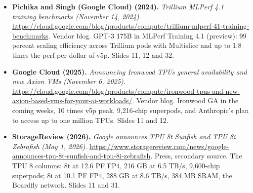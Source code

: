 \documentclass[11pt,letterpaper]{article}
\begin{document}
\begin{itemize}[leftmargin=1.2em,itemsep=3pt]
\item \textbf{Pichika and Singh (Google Cloud) (2024).} \textit{Trillium MLPerf 4.1 training benchmarks (November 14, 2024)}. \url{https://cloud.google.com/blog/products/compute/trillium-mlperf-41-training-benchmarks}. Vendor blog. GPT-3 175B in MLPerf Training 4.1 (preview): 99 percent scaling efficiency across Trillium pods with Multislice and up to 1.8 times the perf per dollar of v5p. Slides 11, 12 and 32.
\item \textbf{Google Cloud (2025).} \textit{Announcing Ironwood TPUs general availability and new Axion VMs (November 6, 2025)}. \url{https://cloud.google.com/blog/products/compute/ironwood-tpus-and-new-axion-based-vms-for-your-ai-workloads/}. Vendor blog. Ironwood GA in the coming weeks, 10 times v5p peak, 9,216-chip superpods, and Anthropic's plan to access up to one million TPUs. Slides 11 and 12.
\item \textbf{StorageReview (2026).} \textit{Google announces TPU 8t Sunfish and TPU 8i Zebrafish (May 1, 2026)}. \url{https://www.storagereview.com/news/google-announces-tpu-8t-sunfish-and-tpu-8i-zebrafish}. Press, secondary source. The TPU 8 columns: 8t at 12.6 PF FP4, 216 GB at 6.5 TB/s, 9,600-chip superpods; 8i at 10.1 PF FP4, 288 GB at 8.6 TB/s, 384 MB SRAM, the Boardfly network. Slides 11 and 31.
\end{itemize}
\end{document}
